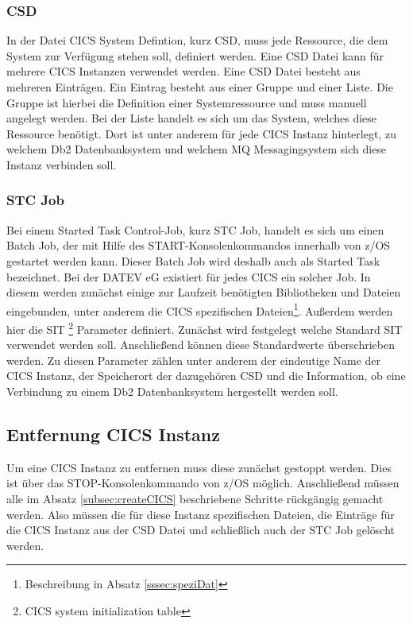 \subsubsection{CSD}
In der Datei \glqq CICS System Defintion\grqq, kurz CSD, muss jede Ressource, die dem System zur Verfügung stehen soll, definiert werden.
Eine CSD Datei kann für mehrere CICS Instanzen verwendet werden.
Eine CSD Datei besteht aus mehreren Einträgen.
Ein Eintrag besteht aus einer Gruppe und einer Liste.
Die Gruppe ist hierbei die Definition einer Systemressource und muss manuell angelegt werden.
Bei der Liste handelt es sich um das System, welches diese Ressource benötigt.
Dort ist unter anderem für jede CICS Instanz hinterlegt, zu welchem Db2 Datenbanksystem und welchem MQ Messagingsystem sich diese Instanz verbinden soll.

\subsubsection{STC Job}
Bei einem Started Task Control-Job, kurz STC Job, handelt es sich um einen Batch Job, der mit Hilfe des \glqq START\grqq-Konsolenkommandos innerhalb von z/OS gestartet werden kann.
Dieser Batch Job wird deshalb auch als Started Task bezeichnet.\cite{Cassier.2007}
Bei der DATEV eG existiert für jedes CICS ein solcher Job.
In diesem werden zunächst einige zur Laufzeit benötigten Bibliotheken und Dateien eingebunden, unter anderem die CICS spezifischen Dateien\footnote{Beschreibung in Absatz \ref{sssec:speziDat}}.
Außerdem werden hier die SIT \footnote{CICS system initialization table} Parameter definiert.
Zunächst wird festgelegt welche Standard SIT verwendet werden soll.
Anschließend können diese Standardwerte überschrieben werden.
Zu diesen Parameter zählen unter anderem der eindeutige Name der CICS Instanz, der Speicherort der dazugehören CSD und die Information, ob eine Verbindung zu einem Db2 Datenbanksystem hergestellt werden soll.

\subsection{Entfernung CICS Instanz}
Um eine CICS Instanz zu entfernen muss diese zunächst gestoppt werden.
Dies ist über das \glqq STOP\grqq-Konsolenkommando von z/OS möglich.
Anschließend müssen alle im Absatz \ref{subsec:createCICS} beschriebene Schritte rückgängig gemacht werden.
Also müssen die für diese Instanz spezifischen Dateien, die Einträge für die CICS Instanz aus der CSD Datei und schließlich auch der STC Job gelöscht werden.

